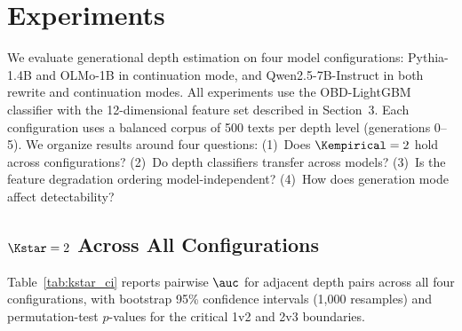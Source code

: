 \section{Experiments}
\label{sec:experiments}

We evaluate generational depth estimation on four model configurations:
Pythia-1.4B and OLMo-1B in continuation mode, and Qwen2.5-7B-Instruct in both rewrite and continuation modes.
All experiments use the OBD-LightGBM classifier with the 12-dimensional feature set described in Section~3.
Each configuration uses a balanced corpus of 500 texts per depth level (generations 0--5).
We organize results around four questions:
(1)~Does $\Kempirical = 2$ hold across configurations?
(2)~Do depth classifiers transfer across models?
(3)~Is the feature degradation ordering model-independent?
(4)~How does generation mode affect detectability?

\subsection{$\Kstar = 2$ Across All Configurations}
\label{sec:kstar_boundary}

Table~\ref{tab:kstar_ci} reports pairwise $\auc$ for adjacent depth pairs
across all four configurations, with bootstrap 95\% confidence intervals
(1{,}000 resamples) and permutation-test $p$-values for the critical 1v2
and 2v3 boundaries.

